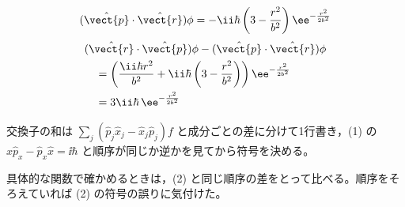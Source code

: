 \[ (\hat{\vect{p}}\cdot\hat{\vect{r}})\phi=-\ii\hbar\left(3-\frac{r^{2}}{b^{2}}\right)\ee^{-\frac{r^{2}}{2b^{2}}} \]
\begin{align*}
&(\hat{\vect{r}}\cdot\hat{\vect{p}})\phi-(\hat{\vect{p}}\cdot\hat{\vect{r}})\phi\\
&\quad=\left(\frac{\ii\hbar r^{2}}{b^{2}}+\ii\hbar\left(3-\frac{r^{2}}{b^{2}}\right)\right)\ee^{-\frac{r^{2}}{2b^{2}}}\\
&\quad=3\ii\hbar\,\ee^{-\frac{r^{2}}{2b^{2}}}
\end{align*}
\item 交換子の和は $\sum_{j}(\hat{p}_{j}\hat{x}_{j}-\hat{x}_{j}\hat{p}_{j})f$ と成分ごとの差に分けて1行書き，(1) の $\hat{x}\hat{p}_{x}-\hat{p}_{x}\hat{x}=\ii\hbar$ と順序が同じか逆かを見てから符号を決める。
\item 具体的な関数で確かめるときは，(2) と同じ順序の差をとって比べる。順序をそろえていれば (2) の符号の誤りに気付けた。
